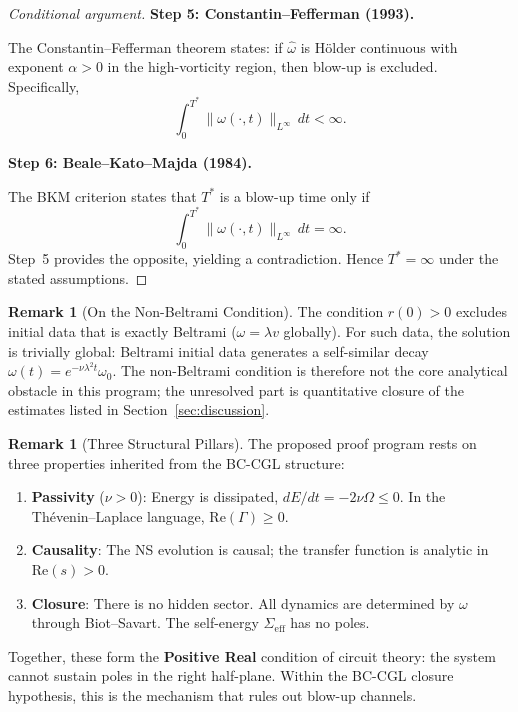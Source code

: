 \documentclass[12pt,a4paper]{article}
\theoremstyle{definition}
\newtheorem{remark}[theorem]{Remark}
\newcommand{\norm}[1]{\lVert #1 \rVert}
\begin{document}
\begin{proof}[Conditional argument]
\medskip\noindent\textbf{Step 5: Constantin--Fefferman (1993).}

The Constantin--Fefferman theorem states: if $\hat{\omega}$ is H\"older continuous with exponent $\alpha > 0$ in the high-vorticity region, then blow-up is excluded. Specifically,
\begin{equation}
  \int_0^{T^*} \norm{\omega(\cdot,t)}_{L^\infty}\,dt < \infty.
\end{equation}

\medskip\noindent\textbf{Step 6: Beale--Kato--Majda (1984).}

The BKM criterion states that $T^*$ is a blow-up time only if
\begin{equation}
  \int_0^{T^*} \norm{\omega(\cdot,t)}_{L^\infty}\,dt = \infty.
\end{equation}
Step~5 provides the opposite, yielding a contradiction. Hence $T^* = \infty$ under the stated assumptions.
\end{proof}

\begin{remark}[On the Non-Beltrami Condition]
The condition $r(0) > 0$ excludes initial data that is exactly Beltrami ($\omega = \lambda v$ globally). For such data, the solution is trivially global: Beltrami initial data generates a self-similar decay $\omega(t) = e^{-\nu\lambda^2 t}\omega_0$. The non-Beltrami condition is therefore not the core analytical obstacle in this program; the unresolved part is quantitative closure of the estimates listed in Section~\ref{sec:discussion}.
\end{remark}

\begin{remark}[Three Structural Pillars]
The proposed proof program rests on three properties inherited from the BC-CGL structure:
\begin{enumerate}[label=(\roman*)]
  \item \textbf{Passivity} ($\nu > 0$): Energy is dissipated, $dE/dt = -2\nu\Omega \leq 0$. In the Th\'evenin--Laplace language, $\mathrm{Re}(\Gamma) \geq 0$.
  \item \textbf{Causality}: The NS evolution is causal; the transfer function is analytic in $\mathrm{Re}(s) > 0$.
  \item \textbf{Closure}: There is no hidden sector. All dynamics are determined by $\omega$ through Biot--Savart. The self-energy $\Sigma_{\mathrm{eff}}$ has no poles.
\end{enumerate}
Together, these form the \textbf{Positive Real} condition of circuit theory: the system cannot sustain poles in the right half-plane. Within the BC-CGL closure hypothesis, this is the mechanism that rules out blow-up channels.
\end{remark}
\end{document}
